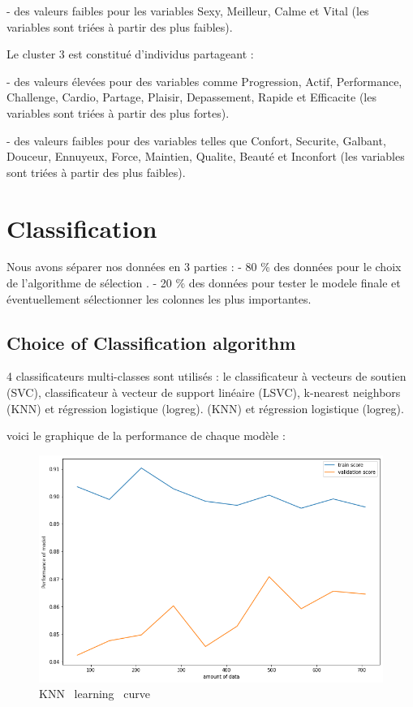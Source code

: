 \documentclass[12pt]{article}
\begin{document}
- des valeurs faibles pour les variables Sexy, Meilleur, Calme et Vital (les variables sont triées à partir des plus faibles).


Le cluster 3 est constitué d'individus partageant :


- des valeurs élevées pour des variables comme Progression, Actif, Performance, Challenge, Cardio, Partage, Plaisir, Depassement, Rapide et Efficacite (les variables sont triées à partir des plus fortes).

- des valeurs faibles pour des variables telles que Confort, Securite, Galbant, Douceur, Ennuyeux, Force, Maintien, Qualite, Beauté et Inconfort (les variables sont triées à partir des plus faibles).


\section{Classification}  %
 
 Nous avons séparer nos données en 3 parties :
- 80 \% des données pour le choix de l'algorithme de sélection .
- 20 \% des données pour tester le modele finale et éventuellement sélectionner les colonnes les plus importantes.

\subsection{Choice of Classification algorithm} 

 4 classificateurs multi-classes sont utilisés : le classificateur à vecteurs de soutien
(SVC), classificateur à vecteur de support linéaire
(LSVC), k-nearest neighbors (KNN) et régression logistique (logreg). 
(KNN) et régression logistique (logreg).

voici le graphique de la  performance de chaque modèle : 


\begin{figure}[H]
\begin{center}
\includegraphics[scale=0.6]{learning_curve_1.png} 
\caption[]{ KNN \ learning \ curve }
\end{center}
\end{figure}
\end{document}
